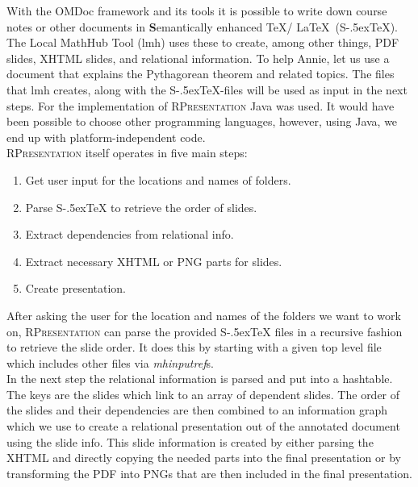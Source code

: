 \documentclass[twoside, 12pt]{article}
\def\stex{\texorpdfstring{\raisebox{-.5ex}S\kern-.5ex\TeX}{sTeX}\xspace}
\def\sTeX{\stex}
\newcommand{\sys}{\textsc{RPresentation}\xspace}
\begin{document}
\begin{figure}
\vspace{-50pt}
\end{figure}

With the OMDoc framework and its tools it is possible to write down course notes or other documents in \textbf{S}emantically enhanced \TeX / \LaTeX\ (\stex). The Local MathHub Tool (lmh) uses these to create, among other things, PDF slides, XHTML slides, and relational information. To help Annie, let us use a document that explains the Pythagorean theorem and related topics. The files that lmh creates, along with the \stex -files will be used as input in the next steps. For the implementation of  \sys Java was used. It would have been possible to choose other programming languages, however, using Java, we end up with platform-independent code.\\

\sys itself operates in five main steps:\\
\vspace{-12pt}
\begin{enumerate}[topsep=0pt,itemsep=-1ex,partopsep=1ex,parsep=1ex]
\item Get user input for the locations and names of folders.
\item Parse \sTeX to retrieve the order of slides.
\item Extract dependencies from relational info.
\item Extract necessary XHTML or PNG parts for slides.
\item Create presentation.
\end{enumerate}
\vspace{5pt}

After asking the user for the location and names of the folders we want to work on, \sys can parse the provided \stex files in a recursive fashion to retrieve the slide order. It does this by starting with a given top level file which includes other files via \textit{mhinputref}s.\\

In the next step the relational information is parsed and put into a hashtable. The keys are the slides which link to an array of dependent slides. The order of the slides and their dependencies are then combined to an information graph which we use to create a relational presentation out of the annotated document using the slide info. This slide information is created by either parsing the XHTML and directly copying the needed parts into the final presentation or by transforming the PDF into PNGs that are then included in the final presentation.\\
\end{document}
